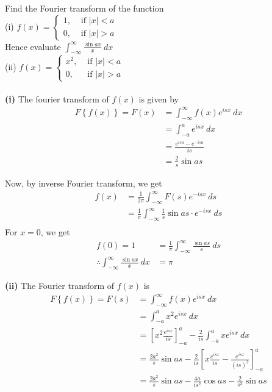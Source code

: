 \documentclass[12pt]{article}
\numberwithin{equation}{subsection}
\begin{document}
\begin{example}{
        Find the Fourier transform of the function \\
        (i) $\displaystyle f(x) = 
        \begin{cases}
            1, &\text{ if } |x|<a \\
            0, &\text{ if } |x|>a
        \end{cases}$ \\
        Hence evaluate $\displaystyle \int_{-\infty}^{\infty} {\frac{\sin{ax}}{x}} \: d{x}$ \\
        (ii) $\displaystyle f(x) =
        \begin{cases}
            x^2, &\text{ if } |x|<a \\
            0, &\text{ if } |x|>a
        \end{cases}$ \\~\\
    }{}
    \textbf{(i)} The fourier transform of $f(x)$ is given by
    \begin{align*}
        F \left\{ f(x) \right\} = F(x) &= \int_{-\infty}^{\infty} {f(x) e^{isx}} \: d{x} \\
        &= \int_{-a}^{a} {e^{isx}} \: d{x} \\
        &= \frac{e^{isa} - e^{-isa}}{is} \\
        &= \frac{2}{s} \sin{as}
    \end{align*}

    Now, by inverse Fourier transform, we get
    \begin{align*}
        f(x) &= \frac{1}{2\pi} \int_{-\infty}^{\infty} {F(s)e^{-isx}} \: d{s} \\
        &= \frac{1}{\pi} \int_{-\infty}^{\infty} { \frac{1}{s} \sin{as} \cdot e^{-isx} } \: d{s} \\
    \end{align*}
    For $x = 0$, we get
    \begin{align*}
        f(0) = 1 &= \frac{1}{\pi} \int_{-\infty}^{\infty} {\frac{\sin{as}}{s}} \: d{s} \\
        \therefore \int_{-\infty}^{\infty} {\frac{\sin{ax}}{x}} \: d{x} &= \pi
    \end{align*}

    \textbf{(ii)} The Fourier transform of $f(x)$ is
     \begin{align*}
        F \left\{ f(x) \right\} = F(s) &= \int_{-\infty}^{\infty} {f(x) e^{isx}} \: d{x} \\
        &= \int_{-a}^{a} {x^2e^{isx}} \: d{x} \\
        &= \left[ x^2 \frac{e^{isx}}{is} \right]_{-a}^{a} - \frac{2}{is} \int_{-a}^{a} {x e^{isx}} \: d{x} \\
        &= \frac{2a^2}{s}\sin{as} - \frac{2}{is} \left[ x \frac{e^{isx}}{is} - \frac{e^{isx}}{(is)^2} \right]_{-a}^{a} \\
        &= \frac{2a^2}{s}\sin{as} - \frac{4a}{is^2}\cos{as} - \frac{2}{s^3}\sin{as}
    \end{align*}
\end{example}
\end{document}
